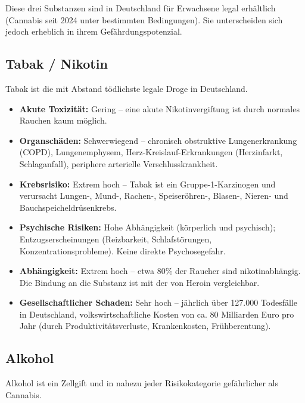 \documentclass[11pt,a4paper]{article}
\begin{document}
	Diese drei Substanzen sind in Deutschland für Erwachsene legal erhältlich (Cannabis seit 2024 unter bestimmten Bedingungen). Sie unterscheiden sich jedoch erheblich in ihrem Gefährdungspotenzial.
	
	\subsection{Tabak / Nikotin}
	
	Tabak ist die mit Abstand tödlichste legale Droge in Deutschland. \cite{dhs-tabak}
	
	\begin{itemize}[leftmargin=*, noitemsep]
		\item \textbf{Akute Toxizität:} Gering – eine akute Nikotinvergiftung ist durch normales Rauchen kaum möglich.
		\item \textbf{Organschäden:} Schwerwiegend – chronisch obstruktive Lungenerkrankung (COPD), Lungenemphysem, Herz-Kreislauf-Erkrankungen (Herzinfarkt, Schlaganfall), periphere arterielle Verschlusskrankheit.
		\item \textbf{Krebsrisiko:} Extrem hoch – Tabak ist ein Gruppe-1-Karzinogen und verursacht Lungen-, Mund-, Rachen-, Speiseröhren-, Blasen-, Nieren- und Bauchspeicheldrüsenkrebs.
		\item \textbf{Psychische Risiken:} Hohe Abhängigkeit (körperlich und psychisch); Entzugserscheinungen (Reizbarkeit, Schlafstörungen, Konzentrationsprobleme). Keine direkte Psychosegefahr.
		\item \textbf{Abhängigkeit:} Extrem hoch – etwa 80\% der Raucher sind nikotinabhängig. Die Bindung an die Substanz ist mit der von Heroin vergleichbar.
		\item \textbf{Gesellschaftlicher Schaden:} Sehr hoch – jährlich über 127.000 Todesfälle in Deutschland, volkswirtschaftliche Kosten von ca. 80 Milliarden Euro pro Jahr (durch Produktivitätsverluste, Krankenkosten, Frühberentung).
	\end{itemize}
	
	\subsection{Alkohol}
	
	Alkohol ist ein Zellgift und in nahezu jeder Risikokategorie gefährlicher als Cannabis. \cite{who-carcinogen}
	
\end{document}
